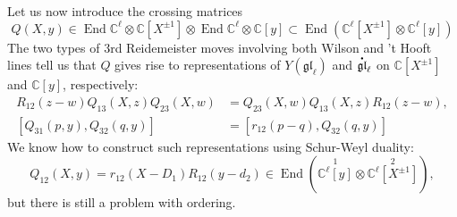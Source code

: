 \documentclass[11pt]{report}
\newcommand*{\dt}[1]{%
  \accentset{\mbox{\large\bfseries .}}{#1}}
\theoremstyle{definition}
\theoremstyle{remark}
\theoremstyle{remark}
\newcommand{\End}{\operatorname{End}}
\newcommand{\C}{\mathbb{C}}
\newcommand{\llbraces}{\{\!\!\{}
\newcommand{\rrbraces}{\}\!\!\}}
\begin{document}
Let us now introduce the crossing matrices
\begin{equation*}
Q(X,y) \in \End \C^\ell \otimes \C[X^{\pm 1}] \otimes \End \C^\ell \otimes \C[y] \subset \End(\C^\ell[X^{\pm 1}] \otimes \C^\ell[y])
\end{equation*}
The two types of 3rd Reidemeister moves involving both Wilson and 't Hooft lines tell us that $Q$ gives rise to representations of $Y(\mathfrak{gl}_\ell)$ and $\dt{\mathfrak{gl}}_\ell$ on $\C[X^{\pm 1}]$ and $\C[y]$, respectively:
\begin{align*}
R_{12}(z-w) Q_{13}(X,z) Q_{23}(X,w) &= Q_{23}(X,w) Q_{13}(X,z) R_{12}(z-w), \\
[Q_{31}(p,y),Q_{32}(q,y)] &= [r_{12}(p-q),Q_{32}(q,y)]
\end{align*}
We know how to construct such representations using Schur-Weyl duality:
\begin{equation*}
Q_{12}(X,y) = r_{12}(X-D_1) R_{12}(y-d_2) \in \End(\overset{1}{\C^\ell[y]} \otimes \overset{2}{\C^\ell[X^{\pm 1}]}),
\end{equation*}
but there is still a problem with ordering.
\end{document}
